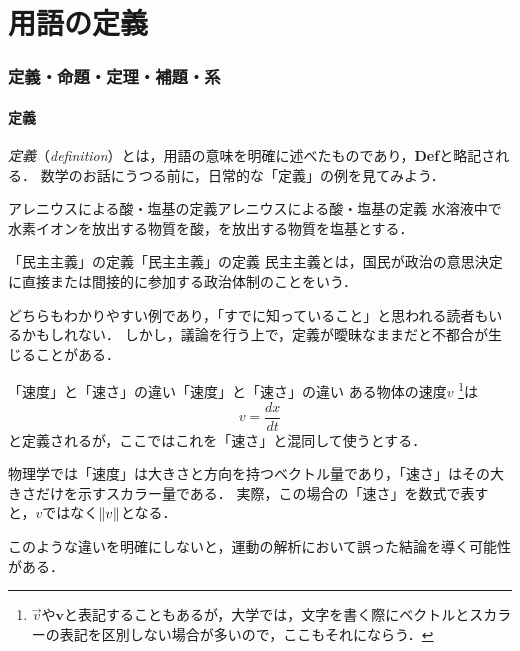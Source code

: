 \part{用語の定義}

\begin{abstract}
  数学の学習を始める前に，定義・命題・定理・補題・系などの基本的な用語について理解を深めたい．
  「『命題』という言葉は知っているけど，『定理』とはどう違うの？」という疑問を持ったり，「『定義』と『定理』の違いがあやふやなままで，よくわからない」と感じる学生は多い．
  高等学校までの知識で，これらの用語を再確認することを試みよう．
\end{abstract}

\section{定義・命題・定理・補題・系}

\subsection{定義}

\emph{定義}（\emph{definition}）とは，用語の意味を明確に述べたものであり，\textbf{Def}と略記される．
数学のお話にうつる前に，日常的な「定義」の例を見てみよう．

\begin{example}{アレニウスによる酸・塩基の定義}{アレニウスによる酸・塩基の定義}
  水溶液中で水素イオンを放出する物質を酸，を放出する物質を塩基とする．
\end{example}

\begin{example}{「民主主義」の定義}{「民主主義」の定義}
  民主主義とは，国民が政治の意思決定に直接または間接的に参加する政治体制のことをいう．
\end{example}

どちらもわかりやすい例であり，「すでに知っていること」と思われる読者もいるかもしれない．
しかし，議論を行う上で，定義が曖昧なままだと不都合が生じることがある．

\begin{example}{「速度」と「速さ」の違い}{「速度」と「速さ」の違い}
  ある物体の速度$v$ \footnote{$\vec{v}$や$\bm{v}$と表記することもあるが，大学では，文字を書く際にベクトルとスカラーの表記を区別しない場合が多いので，ここもそれにならう．}は
  \[
    v = \frac{dx}{dt}
  \]
  と定義されるが，ここではこれを「速さ」と混同して使うとする．

  物理学では「速度」は大きさと方向を持つベクトル量であり，「速さ」はその大きさだけを示すスカラー量である．
  実際，この場合の「速さ」を数式で表すと，$v$ではなく$\lVert v\rVert$となる．

  このような違いを明確にしないと，運動の解析において誤った結論を導く可能性がある．
\end{example}

